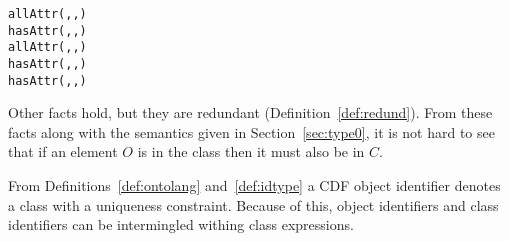 \begin{example}
{\begin{tabbing}
\> {\tt allAttr(,,) } \\
\> \> {\tt hasAttr(,,) } \\
\> {\tt allAttr(,,) } \\
\> \> {\tt hasAttr(,,) } \\
\> \> {\tt hasAttr(,,) } 
\end{tabbing}
} 
\noindent
Other facts hold, but they are redundant
(Definition~\ref{def:redund}).  From these facts along with the
semantics given in Section~\ref{sec:type0}, it is not hard to see that
if an element $O$ is in the class {\tt {}} then it
must also be in $C$.
\end{example}
From Definitions~\ref{def:ontolang} and~\ref{def:idtype} a CDF object
identifier denotes a class with a uniqueness constraint.  Because of
this, object identifiers and class identifiers can be intermingled
withing class expressions.

